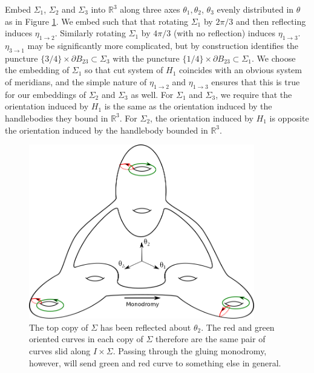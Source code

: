 \documentclass[12pt]{amsart}
\newcommand{\R}{\mathbb{R}}
\newcommand{\del}{\partial }
\theoremstyle{definition}
\theoremstyle{remark}
\begin{document}
Embed $\Sigma_1$, $\Sigma_2$ and $\Sigma_3$ into $\R^3$ along three axes $\theta_1,\theta_2$, $\theta_3$ evenly distributed in $\theta$ as in Figure \ref{embeddingsigmas}.
We embed such that that rotating $\Sigma_1$ by $2\pi/3$ and then reflecting induces $\eta_{1 \to 2}$.
Similarly rotating $\Sigma_1$ by $4\pi/3$ (with no reflection) induces $\eta_{1 \to 3}$.
$\eta_{3 \to 1}$ may be significantly more complicated, but by construction identifies the puncture $\{3/4\} \times \del B_{23} \subset \Sigma_3$ with the puncture $\{1/4\} \times \del B_{23} \subset \Sigma_1$.
We choose the embedding of $\Sigma_1$ so that cut system of $H_1$ coincides with an obvious system of meridians, and the simple nature of $\eta_{1 \to 2}$ and $\eta_{1 \to 3}$ ensures that this is true for our embeddings of $\Sigma_2$ and $\Sigma_3$ as well.
For $\Sigma_1$ and $\Sigma_3$, we require that the orientation induced by $H_1$ is the same as the orientation induced by the handlebodies they bound in $\R^3$.
For $\Sigma_2$, the orientation induced by $H_1$ is opposite the orientation induced by the handlebody bounded in $\R^3$.

\begin{figure}[h]
\centering
\includegraphics[height=3in]{sigmas.png}
\caption{  The top copy of $\Sigma$ has been reflected about $\theta_2$.
The red and green oriented curves in each copy of $\Sigma$ therefore are the same pair of curves slid along $I \times \Sigma$.
Passing through the gluing monodromy, however, will send green and red curve to something else in general.}
\label{embeddingsigmas}
\end{figure}
\end{document}

